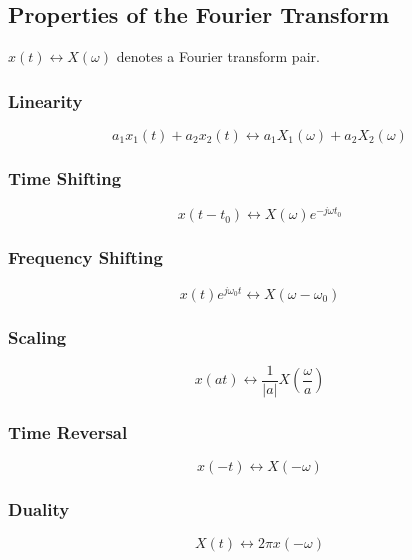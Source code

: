 \documentclass[]{article}
\begin{document}
\begin{multicols}{2}
\subsection{Properties of the Fourier Transform}
$ x(t) \longleftrightarrow X(\omega)$ denotes a Fourier transform pair.
\subsubsection{Linearity}
\begin{equation} a_{1} x_{1}(t) + a_{2} x_{2}(t) \longleftrightarrow a_{1} X_{1}(\omega) + a_{2} X_{2}(\omega)\label{fourier_linearity} \end{equation}
\subsubsection{Time Shifting}
\begin{equation} x(t-t_{0}) \longleftrightarrow X(\omega)e^{-j\omega t_{0}}\label{fourier_time_shifting} \end{equation}
\subsubsection{Frequency Shifting}
\begin{equation} x(t)e^{j\omega_{0} t} \longleftrightarrow X(\omega - \omega_{0})\label{fourier_frequency_shifting} \end{equation}
\subsubsection{Scaling}
\begin{equation} x(at) \longleftrightarrow \frac{1}{|a|}X(\frac{\omega}{a})\label{fourier_scaling} \end{equation}
\subsubsection{Time Reversal}
\begin{equation} x(-t) \longleftrightarrow X(-\omega)\label{fourier_time_reversal} \end{equation}
\subsubsection{Duality}
\begin{equation} X(t) \longleftrightarrow 2\pi x(-\omega)\label{fourier_duality} \end{equation}

\end{multicols}
\end{document}
